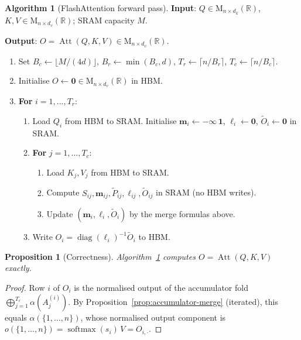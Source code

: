 \documentclass[11pt]{amsart}
\theoremstyle{plain}
\newtheorem{proposition}[theorem]{Proposition}
\theoremstyle{definition}
\newtheorem{algorithm}[theorem]{Algorithm}
\newcommand{\R}{\mathbb{R}}
\newcommand{\Mat}[2]{\mathrm{M}_{#1 \times #2}(\R)}
\newcommand{\softmax}{\operatorname{softmax}}
\newcommand{\Att}{\operatorname{Att}}
\newcommand{\diag}{\operatorname{diag}}
\begin{document}
\begin{algorithm}[FlashAttention forward pass]
\label{alg:flashattention}
\textbf{Input}: $Q \in \Mat{n}{d_k}$, $K, V \in \Mat{n}{d_v}$;
SRAM capacity $M$.

\textbf{Output}: $O = \Att(Q,K,V) \in \Mat{n}{d_v}$.

\begin{enumerate}
    \item Set $B_c \leftarrow \lfloor M/(4d)\rfloor$,
    $B_r \leftarrow \min(B_c, d)$,
    $T_r \leftarrow \lceil n/B_r \rceil$,
    $T_c \leftarrow \lceil n/B_c \rceil$.
    \item Initialise $O \leftarrow \mathbf{0} \in \Mat{n}{d_v}$
    in HBM.
    \item \textbf{For} $i = 1, \ldots, T_r$:
    \begin{enumerate}
        \item Load $Q_i$ from HBM to SRAM.
        Initialise $\mathbf{m}_i \leftarrow -\infty\,\mathbf{1}$,
        $\boldsymbol{\ell}_i \leftarrow \mathbf{0}$,
        $\tilde{O}_i \leftarrow \mathbf{0}$ in SRAM.
        \item \textbf{For} $j = 1, \ldots, T_c$:
        \begin{enumerate}
            \item Load $K_j, V_j$ from HBM to SRAM.
            \item Compute $S_{ij}, \mathbf{m}_{ij},
            \tilde{P}_{ij}, \boldsymbol{\ell}_{ij}, \tilde{O}_{ij}$
            in SRAM (no HBM writes).
            \item Update $(\mathbf{m}_i, \boldsymbol{\ell}_i, \tilde{O}_i)$
            by the merge formulas above.
        \end{enumerate}
        \item Write $O_i = \diag(\boldsymbol{\ell}_i)^{-1}\tilde{O}_i$
        to HBM.
    \end{enumerate}
\end{enumerate}
\end{algorithm}

\begin{proposition}[Correctness]
\label{prop:flashattention-correct}
Algorithm~\ref{alg:flashattention} computes $O = \Att(Q,K,V)$ exactly.
\end{proposition}
\begin{proof}
Row $i$ of $O_i$ is the normalised output of the accumulator fold
$\bigoplus_{j=1}^{T_c} \alpha(A_j^{(i)})$.  By
Proposition~\ref{prop:accumulator-merge} (iterated), this equals
$\alpha(\{1,\ldots,n\})$, whose normalised output component is
$o(\{1,\ldots,n\}) = \softmax(s_i)\,V = O_{i,\cdot}$.
\end{proof}
\end{document}
